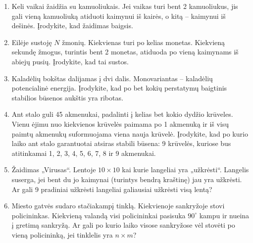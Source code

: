 \documentclass[11pt,a4paper]{scrartcl}
\begin{document}
\begin{enumerate}
    \item Keli vaikai žaidžia su kamuoliukais. Jei vaikas turi bent 2 kamuoliukus, jis gali vieną kamuoliuką atiduoti kaimynui iš kairės, o kitą – kaimynui iš dešinės. Įrodykite, kad žaidimas baigsis.
    \item Eilėje sustoję $N$ žmonių. Kiekvienas turi po kelias monetas. Kiekvieną sekundę žmogus, turintis bent 2 monetas, atiduoda po vieną kaimynams iš abiejų pusių. Įrodykite, kad tai sustos.
    \item Kaladėlių bokštas dalijamas į dvi dalis. Monovariantas – kaladėlių potencialinė energija. Įrodykite, kad po bet kokių perstatymų baigtinis stabilios būsenos aukštis yra ribotas.
    \item Ant stalo guli 45 akmenukai, padalinti į kelias bet kokio dydžio krūveles. Vienu ėjimu nuo kiekvienos krūvelės paimama po 1 akmenuką ir iš visų paimtų akmenukų suformuojama viena nauja krūvelė. Įrodykite, kad po kurio laiko ant stalo garantuotai atsiras stabili būsena: 9 krūvelės, kuriose bus atitinkamai 1, 2, 3, 4, 5, 6, 7, 8 ir 9 akmenukai.
    
    \item Žaidimas „Virusas“. Lentoje $10 \times 10$ kai kurie langeliai yra „užkrėsti“. Langelis suserga, jei bent du jo kaimynai (turintys bendrą kraštinę) jau yra užkrėsti. Ar gali 9 pradiniai užkrėsti langeliai galiausiai užkrėsti visą lentą?
    \item Miesto gatvės sudaro stačiakampį tinklą. Kiekvienoje sankryžoje stovi policininkas. Kiekvieną valandą visi policininkai pasisuka $90^\circ$ kampu ir nueina į gretimą sankryžą. Ar gali po kurio laiko visose sankryžose vėl stovėti po vieną policininką, jei tinklelis yra $n \times m$?
    

\end{enumerate}
\end{document}
